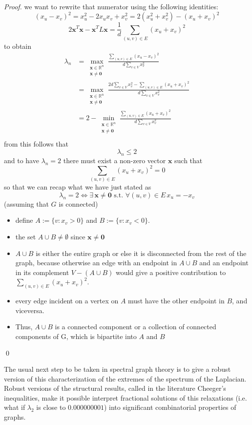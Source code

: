 \begin{theorem}
\begin{proof}
we want to rewrite that numerator using the following identities:
\[ (x_u - x_v)^2 = x_u^2 -2x_{u}x_{v} + x_v^2 = 2(x_u^2 + x_v^2) - (x_u+x_v)^2 \]
\[ 2 \mathbf{x}^T\mathbf{x} -\mathbf{x}^T L \mathbf{x} = \frac{1}{d} \sum_{(u,v)\in E}(x_u+x_v)^2 \]
to obtain
\begin{align}
\lambda_n & = \max_{\substack{\mathbf{x} \in \mathbb{R}^n \\ \mathbf{x} \ne \mathbf{0}}} \frac{\sum_{(u,v)\in E}(x_u-x_v)^2}{d \sum_{v \in V} x_v^2 } \\
          & = \max_{\substack{\mathbf{x} \in \mathbb{R}^n \\ \mathbf{x} \ne \mathbf{0}}} \frac{2d \sum_{v \in V} x_v^2 -\sum_{(u,v)\in E}(x_u+x_v)^2}{d \sum_{v \in V} x_v^2 } \\
          & = 2 - \min_{\substack{\mathbf{x} \in \mathbb{R}^n \\ \mathbf{x} \ne \mathbf{0}}} \frac{\sum_{(u,v)\in E}(x_u+x_v)^2}{d \sum_{v \in V} x_v^2 } \\
\end{align}
from this follows that 
\[ \lambda_n \leq 2 \]
and to have $ \lambda_n = 2 $ there must exist a non-zero vector $ \mathbf{x} $ such that 
\[ \sum_{(u,v)\in E}(x_u+x_v)^2 = 0 \]
so that we can recap what we have just stated as
\[\lambda_n = 2 \iff \exists \, \mathbf{x} \ne \mathbf{0} \text{ s.t. } \forall (u,v) \in E \, x_u = -x_v \]
(assuming that $ G $ is connected) \\
\begin{itemize}
\item define $ A:=\{v : x_v > 0\} $ and $ B:=\{v : x_v < 0\} $. \\
\item the set $ A \cup B  \ne \emptyset $ since $ \mathbf{x} \ne \mathbf{0} $
\item $ A \cup B $ is either the entire graph or else it is disconnected from the rest of the graph, because otherwise an edge with an endpoint in $ A \cup B $ and an endpoint in its complement $ V - (A \cup B)$ would give a positive contribution to $ \sum_{(u,v)\in E}(x_u+x_v)^2 $.\\
\item every edge incident on a vertex on $ A $ must have the other endpoint in $ B $, and viceversa.\\
\item Thus, $ A \cup B$ is a connected component or a collection of connected components of G, which is bipartite into $ A $ and $ B $
\end{itemize}
\qed
\end{proof}
\end{theorem}
The usual next step to be taken in spectral graph theory is to give a robust version of this characterization of the extremes of the spectrum of the Laplacian. Robust versions of the structural results, called in the literature Cheeger's inequalities, make it possible interpret fractional solutions of this relaxations (i.e. what if $ \lambda_2 $ is close to $ 0.000000001 $) into significant combinatorial properties of graphs.
